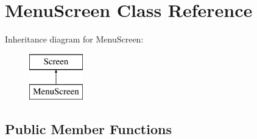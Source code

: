 \hypertarget{classMenuScreen}{}\section{Menu\+Screen Class Reference}
\label{classMenuScreen}
Inheritance diagram for Menu\+Screen\+:\begin{figure}[H]
\begin{center}
\leavevmode
\includegraphics[height=2.000000cm]{classMenuScreen}
\end{center}
\end{figure}
\subsection*{Public Member Functions}
